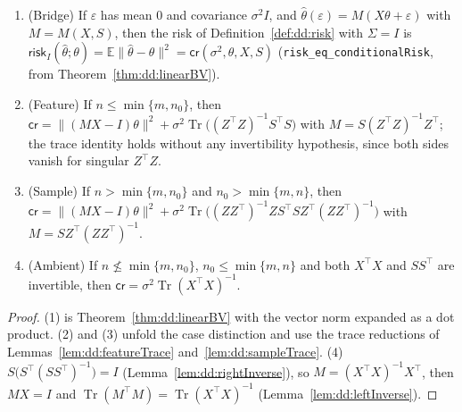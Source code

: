 \begin{lemma}\label{lem:dd:globalBranches}
  \leanok
\begin{enumerate}
  \item (Bridge) If $\varepsilon$ has mean $0$ and covariance $\sigma^2I$, and $\hat\theta(\varepsilon)=M(X\theta+\varepsilon)$ with $M=M(X,S)$, then the risk of Definition~\ref{def:dd:risk} with $\Sigma=I$ is $\mathsf{risk}_I(\hat\theta;\theta)=\mathbb E\|\hat\theta-\theta\|^2=\mathsf{cr}(\sigma^2,\theta,X,S)$ (\texttt{risk\_eq\_conditionalRisk}, from Theorem~\ref{thm:dd:linearBV}).
  \item (Feature) If $n\le\min\{m,n_0\}$, then $\mathsf{cr}=\|(MX-I)\theta\|^2+\sigma^2\operatorname{Tr}\bigl((Z^\top Z)^{-1}S^\top S\bigr)$ with $M=S(Z^\top Z)^{-1}Z^\top$; the trace identity holds without any invertibility hypothesis, since both sides vanish for singular $Z^\top Z$.
  \item (Sample) If $n>\min\{m,n_0\}$ and $n_0>\min\{m,n\}$, then $\mathsf{cr}=\|(MX-I)\theta\|^2+\sigma^2\operatorname{Tr}\bigl((ZZ^\top)^{-1}ZS^\top SZ^\top(ZZ^\top)^{-1}\bigr)$ with $M=SZ^\top(ZZ^\top)^{-1}$.
  \item (Ambient) If $n\not\le\min\{m,n_0\}$, $n_0\le\min\{m,n\}$ and both $X^\top X$ and $SS^\top$ are invertible, then $\mathsf{cr}=\sigma^2\operatorname{Tr}(X^\top X)^{-1}$.
\end{enumerate}
\end{lemma}

\begin{proof}
  \leanok
(1) is Theorem~\ref{thm:dd:linearBV} with the vector norm expanded as a dot product. (2) and (3) unfold the case distinction and use the trace reductions of Lemmas~\ref{lem:dd:featureTrace} and~\ref{lem:dd:sampleTrace}. (4) $S\bigl(S^\top(SS^\top)^{-1}\bigr)=I$ (Lemma~\ref{lem:dd:rightInverse}),
so $M=(X^\top X)^{-1}X^\top$, then $MX=I$ and $\operatorname{Tr}(M^\top M)=\operatorname{Tr}(X^\top X)^{-1}$ (Lemma~\ref{lem:dd:leftInverse}).
\end{proof}

